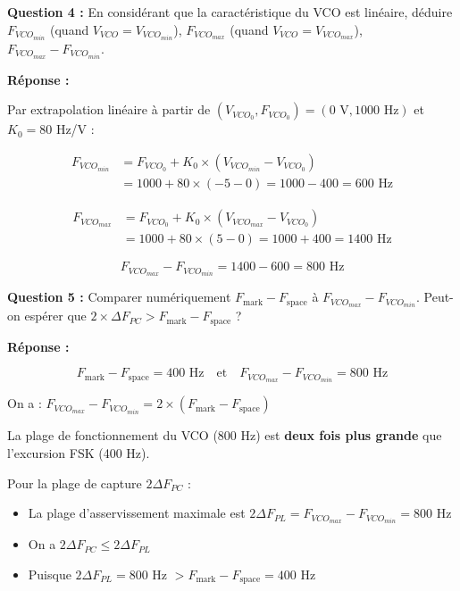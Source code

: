 \documentclass[a4paper,11pt]{article}
\begin{document}
\vspace{0.5cm}
\textbf{Question 4 :} En considérant que la caractéristique du VCO est linéaire, déduire $F_{VCO_{min}}$ (quand $V_{VCO} = V_{VCO_{min}}$), $F_{VCO_{max}}$ (quand $V_{VCO} = V_{VCO_{max}}$), $F_{VCO_{max}} - F_{VCO_{min}}$.

\vspace{0.3cm}
\textbf{Réponse :}

Par extrapolation linéaire à partir de $(V_{VCO_0}, F_{VCO_0}) = (0\text{ V}, 1000\text{ Hz})$ et $K_0 = 80$ Hz/V :

\begin{align*}
F_{VCO_{min}} &= F_{VCO_0} + K_0 \times (V_{VCO_{min}} - V_{VCO_0}) \\
&= 1000 + 80 \times (-5 - 0) = 1000 - 400 = \boxed{600 \text{ Hz}}
\end{align*}

\begin{align*}
F_{VCO_{max}} &= F_{VCO_0} + K_0 \times (V_{VCO_{max}} - V_{VCO_0}) \\
&= 1000 + 80 \times (5 - 0) = 1000 + 400 = \boxed{1400 \text{ Hz}}
\end{align*}

\[
F_{VCO_{max}} - F_{VCO_{min}} = 1400 - 600 = \boxed{800 \text{ Hz}}
\]

\vspace{0.5cm}
\textbf{Question 5 :} Comparer numériquement $F_{\text{mark}} - F_{\text{space}}$ à $F_{VCO_{max}} - F_{VCO_{min}}$. Peut-on espérer que $2 \times \Delta F_{PC} > F_{\text{mark}} - F_{\text{space}}$ ?

\vspace{0.3cm}
\textbf{Réponse :}

\[
F_{\text{mark}} - F_{\text{space}} = 400 \text{ Hz} \quad \text{et} \quad F_{VCO_{max}} - F_{VCO_{min}} = 800 \text{ Hz}
\]

On a : $F_{VCO_{max}} - F_{VCO_{min}} = 2 \times (F_{\text{mark}} - F_{\text{space}})$

La plage de fonctionnement du VCO (800 Hz) est \textbf{deux fois plus grande} que l'excursion FSK (400 Hz).

Pour la plage de capture $2\Delta F_{PC}$ :
\begin{itemize}
    \item La plage d'asservissement maximale est $2\Delta F_{PL} = F_{VCO_{max}} - F_{VCO_{min}} = 800$ Hz
    \item On a $2\Delta F_{PC} \leq 2\Delta F_{PL}$
    \item Puisque $2\Delta F_{PL} = 800$ Hz $> F_{\text{mark}} - F_{\text{space}} = 400$ Hz
\end{itemize}
\end{document}
